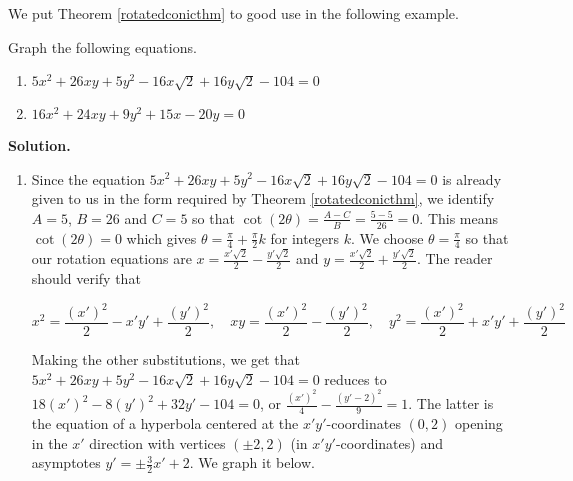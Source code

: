 We put Theorem \ref{rotatedconicthm} to good use in the following example.

\begin{ex} \label{graphrotatedconicex} Graph the following equations.

\begin{enumerate}

\item \label{rotatedhyperbolaex}  $5x^2+26xy+5y^2-16x\sqrt{2}+16y\sqrt{2}-104 = 0$

\item \label{rotatedparabolaex} $16x^2+24xy+9y^2 +15x-20y = 0$

\end{enumerate}

{\bf Solution.}  

\begin{enumerate}

\item Since the equation $5x^2+26xy+5y^2-16x\sqrt{2}+16y\sqrt{2}-104 = 0$ is already given to us in the form required by Theorem \ref{rotatedconicthm}, we identify $A = 5$, $B = 26$ and $C = 5$ so that $\cot(2\theta) = \frac{A-C}{B} = \frac{5-5}{26} = 0$.  This means $\cot(2\theta) = 0$ which gives $\theta = \frac{\pi}{4} + \frac{\pi}{2} k$ for integers $k$.  We choose $\theta = \frac{\pi}{4}$ so that our rotation equations are $x = \frac{x' \sqrt{2}}{2} -\frac{y' \sqrt{2}}{2}$ and $y = \frac{x' \sqrt{2}}{2} + \frac{y' \sqrt{2}}{2}$.  The reader should verify that 

\vspace{-.1in}

\[ x^2 = \frac{(x')^2}{2} - x'y' +\frac{(y')^2}{2}, \quad xy = \frac{(x')^2}{2} -\frac{(y')^2}{2}, \quad y^2 = \frac{(x')^2}{2} + x'y' +\frac{(y')^2}{2} \]

Making the other substitutions, we get that $5x^2+26xy+5y^2-16x\sqrt{2}+16y\sqrt{2}-104 = 0$ reduces to $18(x')^2-8(y')^2+32y'-104 = 0$, or $\frac{(x')^2}{4} -\frac{(y'-2)^2}{9} = 1$.  The latter is the equation of a hyperbola centered at the $x'y'$-coordinates $(0,2)$ opening in the $x'$ direction with vertices $(\pm 2,2)$ (in $x'y'$-coordinates)  and asymptotes $y' = \pm \frac{3}{2} x' + 2$.  We graph it below.



\end{enumerate}
\end{ex}
